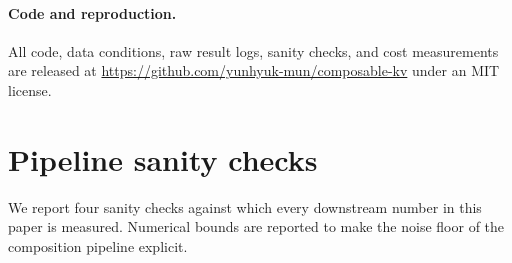 \documentclass[11pt]{article}
\begin{document}
\paragraph{Code and reproduction.} All code, data conditions, raw result logs, sanity checks, and cost measurements are released at \url{https://github.com/yunhyuk-mun/composable-kv} under an MIT license.




\appendix

\section{Pipeline sanity checks}\label{app:sanity}

We report four sanity checks against which every downstream number in this paper is measured. Numerical bounds are reported to make the noise floor of the composition pipeline explicit.
\end{document}
